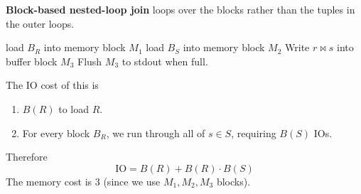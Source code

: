 \documentclass{article}
\begin{document}
      \begin{algo}
        \textbf{Block-based nested-loop join} loops over the blocks rather than the tuples in the outer loops.  
        \begin{algorithm}[H]
          \begin{algorithmic}
                \State load $B_R$ into memory block $M_1$ 
                  \State load $B_S$ into memory block $M_2$ 
                      \State Write $r \bowtie s$ into buffer block $M_3$ 
                      \State Flush $M_3$ to stdout when full. 
                    \EndIf 
                  \EndFor
                \EndFor
              \EndFor
            \EndFunction
          \end{algorithmic}
        \end{algorithm}
        The IO cost of this is 
        \begin{enumerate}
          \item $B(R)$ to load $R$. 
          \item For every block $B_R$, we run through all of $s \in S$, requiring $B(S)$ IOs. 
        \end{enumerate}
        Therefore
        \begin{equation}
          \mathrm{IO} = B(R) + B(R) \cdot B(S)
        \end{equation}
        The memory cost is $3$ (since we use $M_1, M_2, M_3$ blocks). 
      \end{algo}
\end{document}
